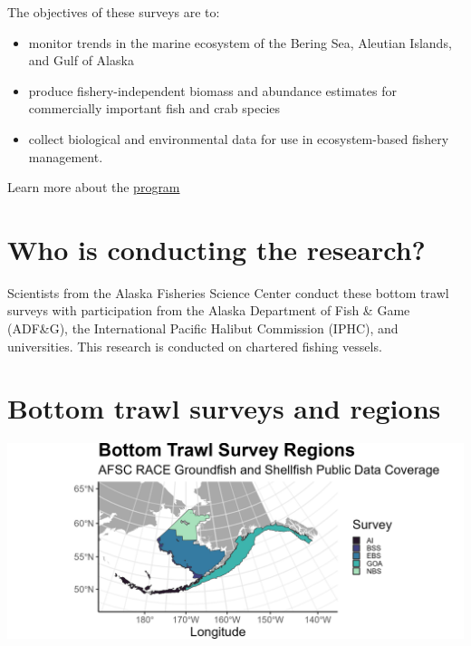 \documentclass[
  letterpaper,
  oneside,
  open=any]{scrbook}
\providecommand{\tightlist}{%
  \setlength{\itemsep}{0pt}\setlength{\parskip}{0pt}}\usepackage{longtable,booktabs,array}
\begin{document}
The objectives of these surveys are to:

\begin{itemize}
\tightlist
\item
  monitor trends in the marine ecosystem of the Bering Sea, Aleutian
  Islands, and Gulf of Alaska
\item
  produce fishery-independent biomass and abundance estimates for
  commercially important fish and crab species
\item
  collect biological and environmental data for use in ecosystem-based
  fishery management.
\end{itemize}

Learn more about the
\href{https://www.fisheries.noaa.gov/alaska/science-data/groundfish-assessment-program-bottom-trawl-surveys}{program}

\hypertarget{who-is-conducting-the-research}{%
\section{Who is conducting the
research?}\label{who-is-conducting-the-research}}

Scientists from the Alaska Fisheries Science Center conduct these bottom
trawl surveys with participation from the Alaska Department of Fish \&
Game (ADF\&G), the International Pacific Halibut Commission (IPHC), and
universities. This research is conducted on chartered fishing vessels.

\hypertarget{bottom-trawl-surveys-and-regions}{%
\section{Bottom trawl surveys and
regions}\label{bottom-trawl-surveys-and-regions}}

\includegraphics[width=7in,height=\textheight]{content/../img/survey_plot.png}
\end{document}
